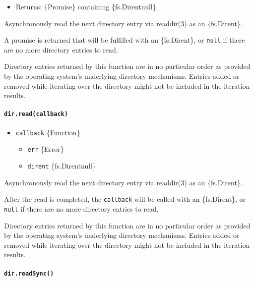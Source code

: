 \begin{itemize}
\tightlist
\item
  Returns: \{Promise\} containing \{fs.Dirent\textbar null\}
\end{itemize}

Asynchronously read the next directory entry via readdir(3) as an
\{fs.Dirent\}.

A promise is returned that will be fulfilled with an \{fs.Dirent\}, or
\texttt{null} if there are no more directory entries to read.

Directory entries returned by this function are in no particular order
as provided by the operating system's underlying directory mechanisms.
Entries added or removed while iterating over the directory might not be
included in the iteration results.

\paragraph{\texorpdfstring{\texttt{dir.read(callback)}}{dir.read(callback)}}\label{dir.readcallback}

\begin{itemize}
\tightlist
\item
  \texttt{callback} \{Function\}

  \begin{itemize}
  \tightlist
  \item
    \texttt{err} \{Error\}
  \item
    \texttt{dirent} \{fs.Dirent\textbar null\}
  \end{itemize}
\end{itemize}

Asynchronously read the next directory entry via readdir(3) as an
\{fs.Dirent\}.

After the read is completed, the \texttt{callback} will be called with
an \{fs.Dirent\}, or \texttt{null} if there are no more directory
entries to read.

Directory entries returned by this function are in no particular order
as provided by the operating system's underlying directory mechanisms.
Entries added or removed while iterating over the directory might not be
included in the iteration results.

\paragraph{\texorpdfstring{\texttt{dir.readSync()}}{dir.readSync()}}\label{dir.readsync}

